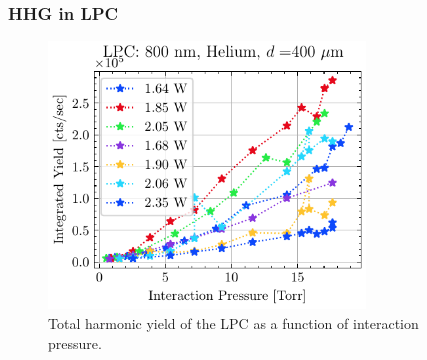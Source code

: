 



\subsubsection{HHG in LPC}

\begin{figure}
	\centering
	\includegraphics[width=0.75\textwidth]{figures/chap3/LPC_P_scaling_He800.pdf}
	\caption{Total harmonic yield of the LPC as a function of interaction pressure.}
	\label{fig:LPC_performance}
\end{figure}

